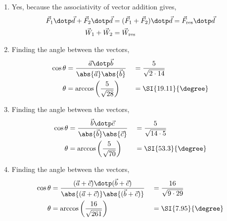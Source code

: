 \begin{enumerate}
    \item Yes, because the associativity of vector addition gives,
          \begin{align}
              \vec{F}_1 \dotp \vec{d} + \vec{F}_2 \dotp \vec{d} &
              = (\vec{F}_1 + \vec{F}_2) \dotp \vec{d}
              = \vec{F}_{\text{res}} \dotp \vec{d}                \\
              \vec{W}_1 + \vec{W}_2                             &
              = \vec{W}_{\text{res}}
          \end{align}

    \item Finding the angle between the vectors,
          \begin{align}
              \cos \theta                   & = \frac{\vec{a} \dotp \vec{b}}
              {\abs{\vec{a}} \abs{\vec{b}}} &
                                            & =\frac{5}{\sqrt{2 \cdot 14}}        \\
              \theta                        & = \arccos\left( \frac{5}{\sqrt{28}}
              \right)                       &
                                            & = \SI{19.11}{\degree}
          \end{align}

    \item Finding the angle between the vectors,
          \begin{align}
              \cos \theta                   & = \frac{\vec{b} \dotp \vec{c}}
              {\abs{\vec{b}} \abs{\vec{c}}} &
                                            & =\frac{5}{\sqrt{14 \cdot 5}}        \\
              \theta                        & = \arccos\left( \frac{5}{\sqrt{70}}
              \right)                       &
                                            & = \SI{53.3}{\degree}
          \end{align}

    \item Finding the angle between the vectors,
          \begin{align}
              \cos \theta                & = \frac{(\vec{a} + \vec{c}) \dotp
                  (\vec{b} + \vec{c})}
              {\abs{(\vec{a} + \vec{c})}
              \abs{(\vec{b} + \vec{c})}} &
                                         & =\frac{16}{\sqrt{9 \cdot 29}}         \\
              \theta                     & = \arccos\left( \frac{16}{\sqrt{261}}
              \right)                    &
                                         & = \SI{7.95}{\degree}
          \end{align}


\end{enumerate}
